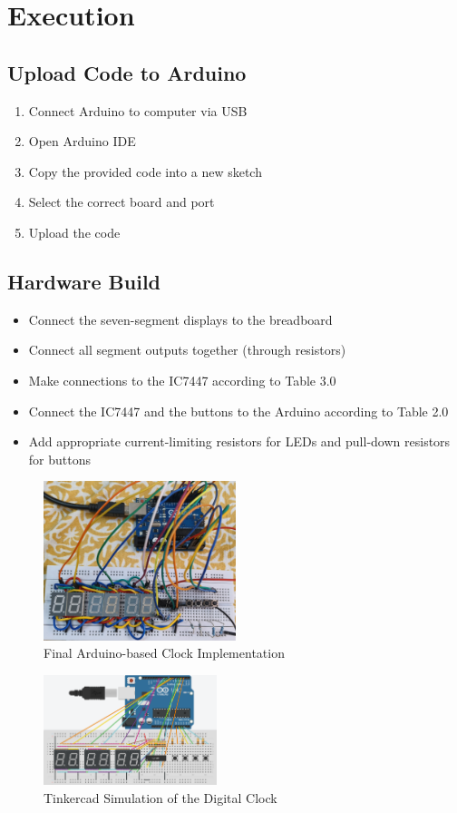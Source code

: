 \section{Execution}
\subsection{Upload Code to Arduino}
\begin{enumerate}
    \item Connect Arduino to computer via USB
    \item Open Arduino IDE
    \item Copy the provided code into a new sketch
    \item Select the correct board and port
    \item Upload the code
\end{enumerate}

\subsection{Hardware Build}
\begin{itemize}
    \item Connect the seven-segment displays to the breadboard
    \item Connect all segment outputs together (through resistors)
    \item Make connections to the IC7447 according to Table 3.0
    \item Connect the IC7447 and the buttons to the Arduino according to Table 2.0
    \item Add appropriate current-limiting resistors for LEDs and pull-down resistors for buttons
\end{itemize}

\begin{figure}[ht]
\centering
\includegraphics[width=0.5\textwidth]{figs/clock.jpg}
\caption{Final Arduino-based Clock Implementation}
\end{figure}

\begin{figure}[ht]
\centering
\includegraphics[width=0.45\textwidth]{figs/Clock_Tinkercad.png}
\caption{Tinkercad Simulation of the Digital Clock}
\end{figure}
